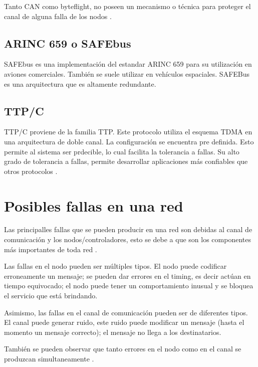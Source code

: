 Tanto CAN como byteflight, no poseen un mecanismo o técnica para proteger el canal de alguna falla de los nodos \citep{Lisner07}.

\subsection{ARINC 659 o SAFEbus}
SAFEbus es una implementación del estandar ARINC 659 para su utilización en aviones comerciales. También se suele utilizar en vehículos espaciales. SAFEBus es una arquitectura que es altamente redundante.

\subsection{TTP/C}
TTP/C proviene de la familia TTP. Este protocolo utiliza el esquema TDMA en una arquitectura de doble canal. La configuración se encuentra pre definida. Esto permite al sistema ser prdecible, lo cual facilita la tolerancia a fallas. Su alto grado de tolerancia a fallas, permite desarrollar aplicaciones más confiables que otros protocolos \citep{Lisner07}.

\section{Posibles fallas en una red}
Las principalles fallas que se pueden producir en una red son debidas al canal de comunicación y los nodos/controladores, esto se debe a que son los componentes más importantes de toda red \citep{Lisner07}.

Las fallas en el nodo pueden ser múltiples tipos. El nodo puede codificar erroneamente un mensaje; se pueden dar errores en el timing, es decir actúan en tiempo equivocado; el nodo puede tener un comportamiento inusual y se bloquea el servicio que está brindando.

Asimismo, las fallas en el canal de comunicación pueden ser de diferentes tipos. El canal puede generar ruido, este ruido puede modificar un mensaje (hasta el momento un mensaje correcto); el mensaje no llega a los destinatarios.

También se pueden observar que tanto errores en el nodo como en el canal se produzcan simultaneamente \citep{Lisner07}.
